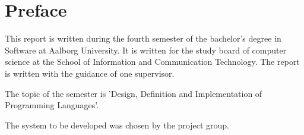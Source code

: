 \chapter*{Preface}
This report is written during the fourth semester of the bachelor's degree in Software at Aalborg University.
It is written for the study board of computer science at the School of Information and Communication Technology.
The report is written with the guidance of one supervisor.

The topic of the semester is 'Design, Definition and Implementation of Programming Languages'.

The system to be developed was chosen by the project group.



\newpage
